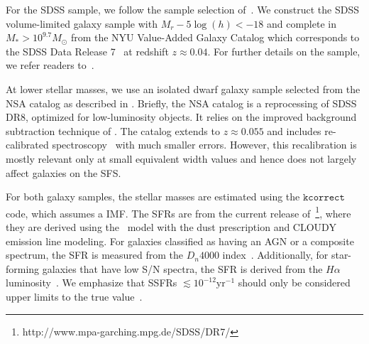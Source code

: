 \documentclass[preprint2,tighten]{aastex62}
\begin{document}
For the SDSS sample, we follow the sample selection of~\cite{tinker2011}. 
We construct the SDSS volume-limited galaxy sample with $M_r - 5\log(h) < -18$ 
and complete in $M_* > 10^{9.7} M_\odot$ from the NYU Value-Added 
Galaxy Catalog \citep[VAGC;][]{blanton2005} which corresponds to 
the SDSS Data Release 7~\citep[DR7;][]{abazajian2009} at redshift 
$z \approx 0.04$. For further details on the sample, we refer readers 
to~\cite{tinker2011,wetzel2013,hahn2017}.

At lower stellar masses, we use an isolated dwarf galaxy sample 
selected from the NSA catalog as described in \citet{geha2012}. 
Briefly, the NSA catalog is a reprocessing of SDSS DR8, optimized 
for low-luminosity objects. It relies on the improved background 
subtraction technique of \cite{blanton2011}. The catalog extends 
to $z \approx 0.055$ and includes re-calibrated spectroscopy~\citep{yan2011,yan2012} 
with much smaller errors. However, this recalibration is mostly 
relevant only at small equivalent width values and hence does not 
largely affect galaxies on the SFS. %

For both galaxy samples, the stellar masses are estimated using the 
\citet{blanton2007} $\mathtt{kcorrect}$ code, which assumes a 
\cite{chabrier2003} IMF. The SFRs are from the current release 
of~\citet{brinchmann2004}\footnote{http://www.mpa-garching.mpg.de/SDSS/DR7/}, 
where they are derived using the~\cite{bruzuala.1993} model with the 
\cite{charlot2000} dust prescription and CLOUDY \citep[version C90.04;][]{ferland1996} emission line modeling.  
For galaxies classified as having an AGN or a composite spectrum, the 
SFR is measured from the $D_n4000$ index~\citep{balogh1998}. 
Additionally, for star-forming galaxies that have low S/N spectra, the SFR 
is derived from the $H{\alpha}$ luminosity~\citep{brinchmann2004}. 
We emphasize that SSFRs $\lesssim 10^{-12} \mathrm{yr}^{-1}$ should only be 
considered upper limits to the true value~\citep{salim2007}.

\end{document}
